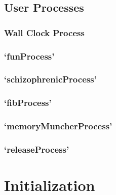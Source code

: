 \documentclass[12pt,twocolumn]{report}
\begin{document}
\section{User Processes}
\label{sec:user_processes}

\subsection{Wall Clock Process}
\label{sec:wall_clock_process}

\subsection{`funProcess'}

\subsection{`schizophrenicProcess'}

\subsection{`fibProcess'}

\subsection{`memoryMuncherProcess'}

\subsection{`releaseProcess'}



\chapter{Initialization}
\end{document}
